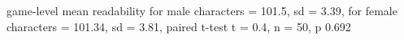 game-level mean readability for male characters = 101.5, sd = 3.39, for female characters = 101.34, sd = 3.81, paired t-test t = 0.4, n = 50, p 0.692